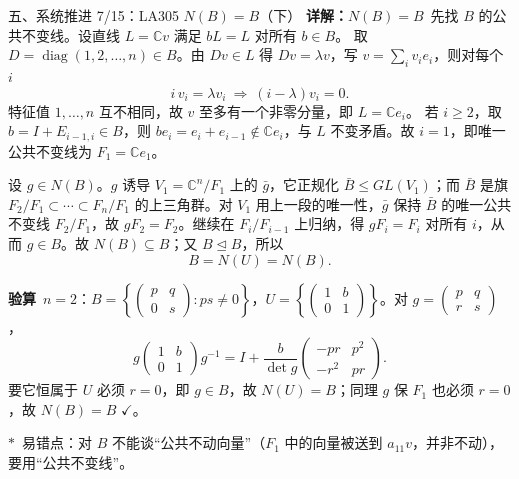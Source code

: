\documentclass[aspectratio=169,10pt,fontset=none]{ctexbeamer}
\newcommand{\key}[1]{\textcolor{ink}{\bfseries #1}}
\newcommand{\starpt}{\textcolor{accent}{\bfseries$\ast$}}
\begin{document}
\begin{frame}[t]{五、系统推进 7/15：LA305 $N(B)=B$（下）}
\scriptsize
\key{详解：$N(B)=B$}\ 先找 $B$ 的公共不变线。设直线 $L=\mathbb C v$ 满足 $bL=L$ 对所有 $b\in B$。
取 $D=\operatorname{diag}(1,2,\dots,n)\in B$。由 $Dv\in L$ 得 $Dv=\lambda v$，写 $v=\sum_i v_i e_i$，则对每个 $i$
\[
i\,v_i=\lambda v_i\ \Longrightarrow\ (i-\lambda)v_i=0.
\]
特征值 $1,\dots,n$ 互不相同，故 $v$ 至多有一个非零分量，即 $L=\mathbb C e_i$。
若 $i\ge2$，取 $b=I+E_{i-1,i}\in B$，则 $be_i=e_i+e_{i-1}\notin\mathbb C e_i$，与 $L$ 不变矛盾。故 $i=1$，即唯一公共不变线为 $F_1=\mathbb C e_1$。

设 $g\in N(B)$。$g$ 诱导 $V_1=\mathbb C^n/F_1$ 上的 $\bar g$，它正规化 $\bar B\le GL(V_1)$；而 $\bar B$ 是旗 $F_2/F_1\subset\cdots\subset F_n/F_1$ 的上三角群。对 $V_1$ 用上一段的唯一性，$\bar g$ 保持 $\bar B$ 的唯一公共不变线 $F_2/F_1$，故 $gF_2=F_2$。继续在 $F_i/F_{i-1}$ 上归纳，得 $gF_i=F_i$ 对所有 $i$，从而 $g\in B$。故 $N(B)\subseteq B$；又 $B\trianglelefteq B$，所以
\[
B=N(U)=N(B).
\]

\key{验算}\ $n=2$：$B=\left\{\begin{pmatrix}p&q\\0&s\end{pmatrix}:ps\ne0\right\}$，$U=\left\{\begin{pmatrix}1&b\\0&1\end{pmatrix}\right\}$。对 $g=\begin{pmatrix}p&q\\r&s\end{pmatrix}$，
\[
g\begin{pmatrix}1&b\\0&1\end{pmatrix}g^{-1}=I+\frac{b}{\det g}\begin{pmatrix}-pr&p^2\\-r^2&pr\end{pmatrix}.
\]
要它恒属于 $U$ 必须 $r=0$，即 $g\in B$，故 $N(U)=B$；同理 $g$ 保 $F_1$ 也必须 $r=0$，故 $N(B)=B$ $\checkmark$。

\starpt\ 易错点：对 $B$ 不能谈“公共不动向量”（$F_1$ 中的向量被送到 $a_{11}v$，并非不动），要用“公共不变线”。
\end{frame}
\end{document}
